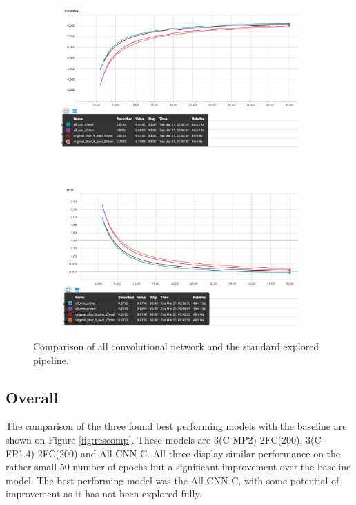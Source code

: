 \documentclass[12pt]{article}
\begin{document}
\begin{figure}[ht!]
    \centering
    \begin{subfigure}[t]{0.475\textwidth}
        \centering
        \includegraphics[width=1.0\linewidth]{disalla.png}
    \end{subfigure}%
    ~ 
    \begin{subfigure}[t]{0.475\textwidth}
        \centering
        \includegraphics[width=1.0\linewidth]{disalle.png}
    \end{subfigure}
    \caption{Comparison of all convolutional network and the standard explored pipeline.}
    \label{fig:allcomp}
\end{figure}

\subsection*{Overall}

The comparison of the three found best performing models with the baseline are shown on Figure \ref{fig:rescomp}. These models are 3(C-MP2) 2FC(200), 3(C-FP1.4)-2FC(200) and All-CNN-C. All three display similar performance on the rather small 50 number of epochs but a significant improvement over the baseline model. The best performing model was the All-CNN-C, with some potential of improvement as it has not been explored fully. 
\end{document}
